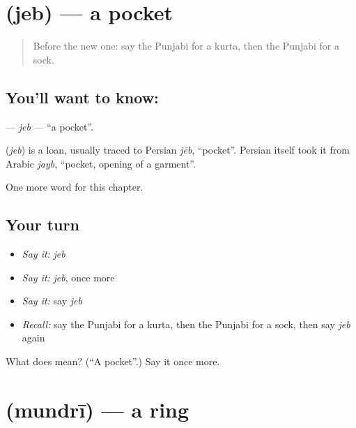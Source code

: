 \section[\texorpdfstring{\pa{ਜੇਬ} (jeb)}{ਜੇਬ (jeb)}]{ (jeb) — a pocket}

\label{lesson:PA-C93-jeb}



\begin{quote}
Before the new one: say the Punjabi for a kurta, then the Punjabi for a sock.
\end{quote}

\subsection*{You'll want to know: }
\textbf{} — \emph{jeb} — \textquotedblleft{}a pocket\textquotedblright{}.

\begin{cousinweb}
\textbf{} (\emph{jeb}) is a loan, usually traced to Persian \emph{jēb}, \textquotedblleft{}pocket\textquotedblright{}. Persian itself took it from Arabic \emph{jayb}, \textquotedblleft{}pocket, opening of a garment\textquotedblright{}.
\end{cousinweb}

\begin{grammarlens}[title={What you've built}]
One more word for this chapter.
\end{grammarlens}

\subsection*{Your turn}
\begin{itemize}
\raggedright
  \item \emph{Say it:} \emph{jeb}
  \item \emph{Say it:} \emph{jeb}, once more
  \item \emph{Say it:} say \emph{jeb}
  \item \emph{Recall:} say the Punjabi for a kurta, then the Punjabi for a sock, then say \emph{jeb} again
\end{itemize}

\begin{tcolorbox}[breakable,colback=teal!4,colframe=teal!35!black,title={Before you move on}]
What does  mean? (\textquotedblleft{}A pocket\textquotedblright{}.) Say it once more.
\end{tcolorbox}
\section[\texorpdfstring{\pa{ਮੁੰਦਰੀ} (mundrī)}{ਮੁੰਦਰੀ (mundrī)}]{ (mundrī) — a ring}

